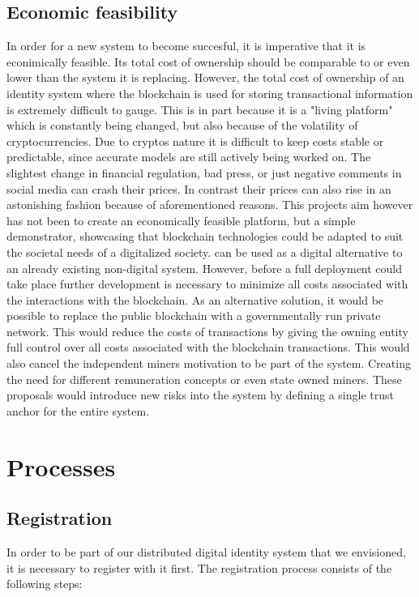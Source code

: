 \subsection{Economic feasibility}
\label{sec:economicFeasibility}
In order for a new system to become succesful, it is imperative that it is econimically feasible. Its total cost of ownership should be comparable to or even lower than the system it is replacing.
However, the total cost of ownership of an identity system where the blockchain is used for storing transactional information is extremely difficult to gauge. This is in part because it is a "living platform" which is constantly being changed, but also because of the volatility of cryptocurrencies.\cite{elendner2016cross}
Due to cryptos nature it is difficult to keep costs stable or predictable, since accurate models are still actively being worked on.\cite{catania2018predicting} The slightest change in financial regulation, bad press, or just negative comments in social media can crash their prices.\cite{kim2016predicting}
In contrast their prices can also rise in an astonishing fashion because of aforementioned reasons. 
This projects aim however has not been to create an economically feasible platform, but a simple demonstrator, showcasing that blockchain technologies could be adapted to suit the societal needs of a digitalized society. \projectName{} can be used as a digital alternative to an already existing non-digital system.
However, before a full deployment could take place further development is necessary to minimize all costs associated with the interactions with the blockchain.
As an alternative solution, it would be possible to replace the public blockchain with a governmentally run private network. This would reduce the costs of transactions by giving the owning entity full control over all costs associated with the blockchain transactions.
This would also cancel the independent miners motivation to be part of the system. Creating the need for different remuneration concepts or even state owned miners. These proposals would introduce new risks into the system by defining a single trust anchor for the entire system. 

\section{Processes}

\subsection{Registration}
In order to be part of our distributed digital identity system that we envisioned, it is necessary to register with it first. The registration process consists of the following steps:

